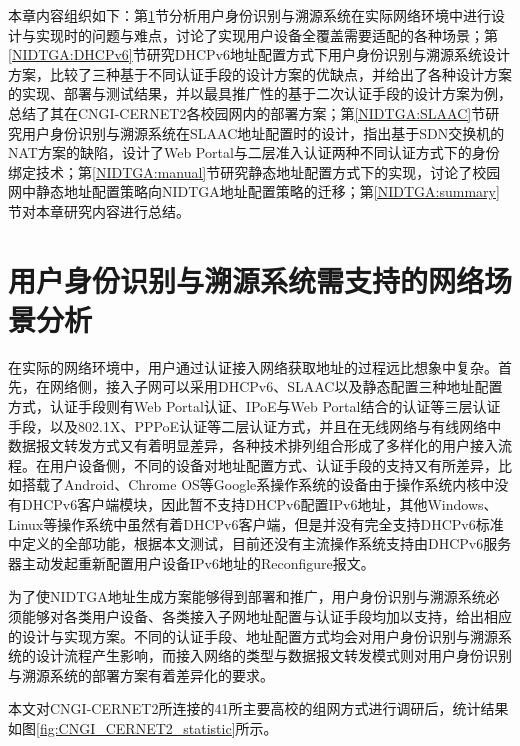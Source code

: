  本章内容组织如下：第\ref{NIDTGA:analyse}节分析用户身份识别与溯源系统在实际网络环境中进行设计与实现时的问题与难点，讨论了实现用户设备全覆盖需要适配的各种场景；第\ref{NIDTGA:DHCPv6}节研究DHCPv6地址配置方式下用户身份识别与溯源系统设计方案，比较了三种基于不同认证手段的设计方案的优缺点，并给出了各种设计方案的实现、部署与测试结果，并以最具推广性的基于二次认证手段的设计方案为例，总结了其在CNGI-CERNET2各校园网内的部署方案；第\ref{NIDTGA:SLAAC}节研究用户身份识别与溯源系统在SLAAC地址配置时的设计，指出基于SDN交换机的NAT方案的缺陷，设计了Web Portal与二层准入认证两种不同认证方式下的身份绑定技术；第\ref{NIDTGA:manual}节研究静态地址配置方式下的实现，讨论了校园网中静态地址配置策略向NIDTGA地址配置策略的迁移；第\ref{NIDTGA:summary}节对本章研究内容进行总结。

  \section{用户身份识别与溯源系统需支持的网络场景分析}
  \label{NIDTGA:analyse}

  在实际的网络环境中，用户通过认证接入网络获取地址的过程远比想象中复杂。首先，在网络侧，接入子网可以采用DHCPv6、SLAAC以及静态配置三种地址配置方式，认证手段则有Web Portal认证、IPoE与Web Portal结合的认证等三层认证手段，以及802.1X、PPPoE认证等二层认证方式，并且在无线网络与有线网络中数据报文转发方式又有着明显差异，各种技术排列组合形成了多样化的用户接入流程。在用户设备侧，不同的设备对地址配置方式、认证手段的支持又有所差异，比如搭载了Android、Chrome OS等Google系操作系统的设备由于操作系统内核中没有DHCPv6客户端模块，因此暂不支持DHCPv6配置IPv6地址，其他Windows、Linux等操作系统中虽然有着DHCPv6客户端，但是并没有完全支持DHCPv6标准中定义的全部功能，根据本文测试，目前还没有主流操作系统支持由DHCPv6服务器主动发起重新配置用户设备IPv6地址的Reconfigure报文。

  为了使NIDTGA地址生成方案能够得到部署和推广，用户身份识别与溯源系统必须能够对各类用户设备、各类接入子网地址配置与认证手段均加以支持，给出相应的设计与实现方案。不同的认证手段、地址配置方式均会对用户身份识别与溯源系统的设计流程产生影响，而接入网络的类型与数据报文转发模式则对用户身份识别与溯源系统的部署方案有着差异化的要求。

  本文对CNGI-CERNET2所连接的41所主要高校的组网方式进行调研后，统计结果如图\ref{fig:CNGI_CERNET2_statistic}所示。

